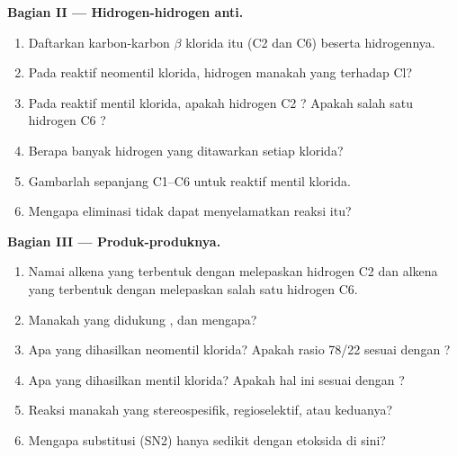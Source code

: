 \begin{problem}
\medskip
\noindent\textbf{Bagian II --- Hidrogen-hidrogen anti.}
\begin{enumerate}[resume]
  \item Daftarkan karbon-karbon $\beta$ klorida itu (C2 dan C6) beserta
        hidrogennya.
  \item Pada  reaktif neomentil klorida, hidrogen manakah yang
         terhadap Cl?
  \item Pada  reaktif mentil klorida, apakah hidrogen C2 ?
        Apakah salah satu hidrogen C6 ?
  \item Berapa banyak hidrogen  yang ditawarkan setiap
        klorida?
  \item Gambarlah  sepanjang C1--C6 untuk  reaktif
        mentil klorida.
  \item Mengapa eliminasi  tidak dapat menyelamatkan reaksi
        itu?
\end{enumerate}

\medskip
\noindent\textbf{Bagian III --- Produk-produknya.}
\begin{enumerate}[resume]
  \item Namai alkena yang terbentuk dengan melepaskan hidrogen C2 dan
        alkena yang terbentuk dengan melepaskan salah satu hidrogen C6.
  \item Manakah yang didukung , dan mengapa?
  \item Apa yang dihasilkan neomentil klorida? Apakah rasio 78/22 sesuai
        dengan ?
  \item Apa yang dihasilkan mentil klorida? Apakah hal ini sesuai dengan
        ?
  \item Reaksi manakah yang stereospesifik, regioselektif, atau keduanya?
  \item Mengapa substitusi (SN2) hanya sedikit dengan etoksida di sini?
\end{enumerate}


\end{problem}
